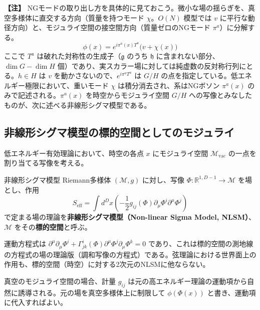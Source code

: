 \documentclass[uplatex, dvipdfmx, book]{jsbook}
\let\origsubsection\subsection
\let\origsubsubsection\subsubsection
\renewcommand{\section}{\origsubsection}
\renewcommand{\subsection}{\origsubsubsection}
\renewcommand{\subsubsection}{\paragraph}
\newenvironment{note}{\vspace{1ex}\par\footnotesize\noindent\textbf{【注】}}{\par\vspace{1ex}}
\begin{document}
\begin{note}
NGモードの取り出し方を具体的に見ておこう。微小な場の揺らぎを、真空多様体に直交する方向（質量を持つモード $\chi$。$O(N)$ 模型では $v$ に平行な動径方向）と、モジュライ空間の接空間方向（質量ゼロのNGモード $\pi^a$）に分解する。
\begin{equation*}
    \phi(x) = e^{i \pi^a(x) T^a} \bigl(v + \chi(x)\bigr)
\end{equation*}
ここで $T^a$ は破れた対称性の生成子（$\mathfrak{g}$ のうち $\mathfrak{h}$ に含まれない部分、$\dim G - \dim H$ 個）であり、実スカラー場に対しては純虚数の反対称行列にとる。$h \in H$ は $v$ を動かさないので、$e^{i\pi^a T^a}$ は $G/H$ の点を指定している。低エネルギー極限において、重いモード $\chi$ は積分消去され、系はNGボソン $\pi^a(x)$ のみで記述される。$\pi^a(x)$ を時空からモジュライ空間 $G/H$ への写像とみなしたものが、次に述べる非線形シグマ模型である。
\end{note}

\section{非線形シグマ模型の標的空間としてのモジュライ}

低エネルギー有効理論において、時空の各点 $x$ にモジュライ空間 $\mathcal{M}_{\text{vac}}$ の一点を割り当てる写像を考える。

\begin{mydef}{非線形シグマ模型}{}
Riemann多様体 $(\mathcal{M}, g)$ に対し、写像 $\Phi: \mathbb{R}^{1, D-1} \to \mathcal{M}$ を場とし、作用
\begin{equation*}
    S_{\text{eff}} = \int d^D x \left( - \frac{1}{2} g_{ij}(\Phi) \partial_\mu \Phi^i \partial^\mu \Phi^j \right)
\end{equation*}
で定まる場の理論を\textbf{非線形シグマ模型（Non-linear Sigma Model, NLSM）}、$\mathcal{M}$ をその\textbf{標的空間}と呼ぶ。
\end{mydef}

運動方程式は $\partial^\mu\partial_\mu \Phi^i + \Gamma^i_{jk}(\Phi)\partial^\mu\Phi^j\partial_\mu\Phi^k = 0$ であり、これは標的空間の測地線の方程式の場の理論版（調和写像の方程式）である。弦理論における世界面上の作用も、標的空間（時空）に対する2次元のNLSMに他ならない。

真空のモジュライ空間の場合、計量 $g_{ij}$ は元の高エネルギー理論の運動項から自然に誘導される。元の場を真空多様体上に制限して $\phi(\Phi(x))$ と書き、運動項に代入すればよい。
\end{document}
